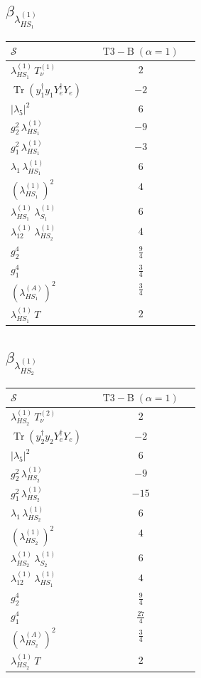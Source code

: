 \documentclass[9pt]{article}
\begin{document}
\subsection*{$ \beta_{\lambda_{HS_1}^{(1)}} $}
\begin{longtable}{@{}p{0.31\linewidth}c@{}}
\toprule
$\mathcal{S}$ & $ \mathrm{T3-B}\;(\alpha=1) $ \\
\midrule
$ \lambda_{HS_1}^{(1)}\,T_{\nu}^{(1)} $ & $ 2 $ \\
$ \operatorname{Tr}(y_1^\dagger y_1Y_e^\dagger Y_e) $ & $ -2 $ \\
$ |\lambda_5|^2 $ & $ 6 $ \\
$ g_2^2\,\lambda_{HS_1}^{(1)} $ & $ -9 $ \\
$ g_1^2\,\lambda_{HS_1}^{(1)} $ & $ -3 $ \\
$ \lambda_1\,\lambda_{HS_1}^{(1)} $ & $ 6 $ \\
$ \left(\lambda_{HS_1}^{(1)}\right)^2 $ & $ 4 $ \\
$ \lambda_{HS_1}^{(1)}\,\lambda_{S_1}^{(1)} $ & $ 6 $ \\
$ \lambda_{12}^{(1)}\,\lambda_{HS_2}^{(1)} $ & $ 4 $ \\
$ g_2^4 $ & $ \frac{9}{4} $ \\
$ g_1^4 $ & $ \frac{3}{4} $ \\
$ \left(\lambda_{HS_1}^{(A)}\right)^2 $ & $ \frac{3}{4} $ \\
$ \lambda_{HS_1}^{(1)}\,T $ & $ 2 $ \\
\bottomrule
\end{longtable}
\subsection*{$ \beta_{\lambda_{HS_2}^{(1)}} $}
\begin{longtable}{@{}p{0.31\linewidth}c@{}}
\toprule
$\mathcal{S}$ & $ \mathrm{T3-B}\;(\alpha=1) $ \\
\midrule
$ \lambda_{HS_2}^{(1)}\,T_{\nu}^{(2)} $ & $ 2 $ \\
$ \operatorname{Tr}(y_2^\dagger y_2Y_e^\dagger Y_e) $ & $ -2 $ \\
$ |\lambda_5|^2 $ & $ 6 $ \\
$ g_2^2\,\lambda_{HS_2}^{(1)} $ & $ -9 $ \\
$ g_1^2\,\lambda_{HS_2}^{(1)} $ & $ -15 $ \\
$ \lambda_1\,\lambda_{HS_2}^{(1)} $ & $ 6 $ \\
$ \left(\lambda_{HS_2}^{(1)}\right)^2 $ & $ 4 $ \\
$ \lambda_{HS_2}^{(1)}\,\lambda_{S_2}^{(1)} $ & $ 6 $ \\
$ \lambda_{12}^{(1)}\,\lambda_{HS_1}^{(1)} $ & $ 4 $ \\
$ g_2^4 $ & $ \frac{9}{4} $ \\
$ g_1^4 $ & $ \frac{27}{4} $ \\
$ \left(\lambda_{HS_2}^{(A)}\right)^2 $ & $ \frac{3}{4} $ \\
$ \lambda_{HS_2}^{(1)}\,T $ & $ 2 $ \\
\bottomrule
\end{longtable}
\end{document}

